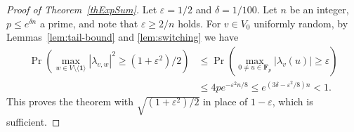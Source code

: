 \documentclass[11pt]{amsart}
\numberwithin{equation}{section}
\theoremstyle{remark}
\newcommand{\F}{\mathbf{F}}
\newcommand\br[1]{{\left(#1\right)}}
\newcommand{\gen}[1]{\langle{#1}\rangle}
\newcommand\eps{\varepsilon}
\def\one{\mathbf{1}}
\begin{document}
\begin{proof}[Proof of Theorem~\ref{thExpSum}]
    Let $\eps = 1/2$ and $\delta = 1/100$.
    Let $n$ be an integer, $p \le e^{\delta n}$ a prime,
    and note that $\eps \ge 2/n$ holds.
    For $v \in V_0$ uniformly random,
    by Lemmas~\ref{lem:tail-bound} and \ref{lem:switching} we have
    \begin{align*}
        \Pr\br{\max_{w \in V \setminus \gen\one} |\lambda_{v,w}|^2 \ge (1 + \eps^2)/2}
        &\le \Pr\br{\max_{0 \ne u \in \F_p} |\lambda_v(u)| \ge \eps} \\
        &\le 4 p e^{-\eps^2 n / 8}
        \le e^{(3 \delta - \eps^2 / 8) n} < 1.
    \end{align*}
    This proves the theorem with $\sqrt{(1 + \eps^2) / 2}$ in place of $1 - \eps$, which is sufficient.
\end{proof}

\vspace{0.1cm}

\vspace{0.3cm}
\end{document}
